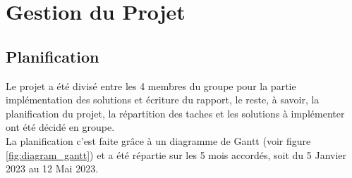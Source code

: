 



\chapter{Gestion du Projet}

\section{Planification}
Le projet a été divisé entre les 4 membres du groupe pour la partie implémentation des solutions et écriture du rapport, le reste, à savoir, la planification du projet, la répartition des taches et les solutions à implémenter ont été décidé en groupe.\\
La planification c'est faite grâce à un diagramme de Gantt (voir figure \ref{fig:diagram_gantt}) et a été répartie sur les 5 mois accordés, soit du 5 Janvier 2023 au 12 Mai 2023.

